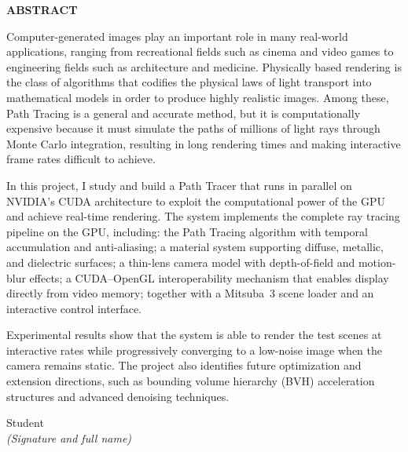 \thispagestyle{empty}
\begin{center}
{\Large\bfseries ABSTRACT}
\end{center}
\vspace{1cm}

Computer-generated images play an important role in many real-world applications,
ranging from recreational fields such as cinema and video games to engineering
fields such as architecture and medicine. Physically based rendering is the class
of algorithms that codifies the physical laws of light transport into mathematical
models in order to produce highly realistic images. Among these, Path Tracing is a
general and accurate method, but it is computationally expensive because it must
simulate the paths of millions of light rays through Monte Carlo integration,
resulting in long rendering times and making interactive frame rates difficult to
achieve.

In this project, I study and build a Path Tracer that runs in parallel on NVIDIA's
CUDA architecture to exploit the computational power of the GPU and achieve
real-time rendering. The system implements the complete ray tracing pipeline on the
GPU, including: the Path Tracing algorithm with temporal accumulation and
anti-aliasing; a material system supporting diffuse, metallic, and dielectric
surfaces; a thin-lens camera model with depth-of-field and motion-blur effects; a
CUDA--OpenGL interoperability mechanism that enables display directly from video
memory; together with a Mitsuba~3 scene loader and an interactive control interface.

Experimental results show that the system is able to render the test scenes at
interactive rates while progressively converging to a low-noise image when the
camera remains static. The project also identifies future optimization and
extension directions, such as bounding volume hierarchy (BVH) acceleration
structures and advanced denoising techniques.

\vspace{1.5cm}
\begin{flushright}
Student\\[0.3cm]
\textit{(Signature and full name)}
\end{flushright}
